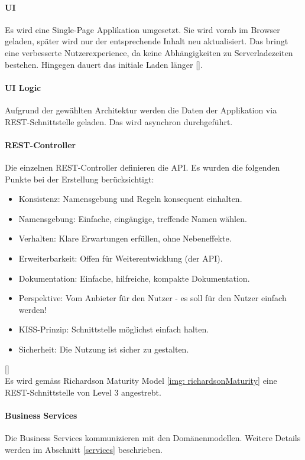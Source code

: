 \paragraph{UI}
Es wird eine Single-Page Applikation umgesetzt. Sie wird vorab im Browser geladen, später wird nur der entsprechende Inhalt neu aktualisiert. Das bringt eine verbesserte Nutzerexperience, da keine Abhängigkeiten zu Serverladezeiten bestehen. Hingegen dauert das initiale Laden länger [\cite{spa}]. 

\paragraph{UI Logic}
Aufgrund der gewählten Architektur werden die Daten der Applikation via \ac{REST}-Schnittstelle geladen. Das wird asynchron durchgeführt.

\paragraph{REST-Controller}
Die einzelnen \ac{REST}-Controller definieren die \ac{API}. Es wurden die folgenden Punkte bei der Erstellung berücksichtigt: 
  \begin{itemize}
	\item Konsistenz: Namensgebung und Regeln konsequent einhalten.
	\item Namensgebung: Einfache, eingängige, treffende Namen wählen.
	\item Verhalten: Klare Erwartungen erfüllen, ohne Nebeneffekte.
	\item Erweiterbarkeit: Offen für Weiterentwicklung (der API).
	\item Dokumentation: Einfache, hilfreiche, kompakte Dokumentation.
	\item Perspektive: Vom Anbieter für den Nutzer - es soll für den Nutzer einfach werden!
	\item KISS-Prinzip: Schnittstelle möglichst einfach halten.
	\item Sicherheit: Die Nutzung ist sicher zu gestalten.
\end{itemize}
[\cite{appeAPIDesign}]\\

Es wird gemäss Richardson Maturity Model \ref{img: richardsonMaturity} eine \ac{REST}-Schnittstelle von Level 3 angestrebt. 

\paragraph{Business Services}
Die Business Services kommunizieren mit den Domänenmodellen. Weitere Details werden im Abschnitt \ref{services} beschrieben. 

